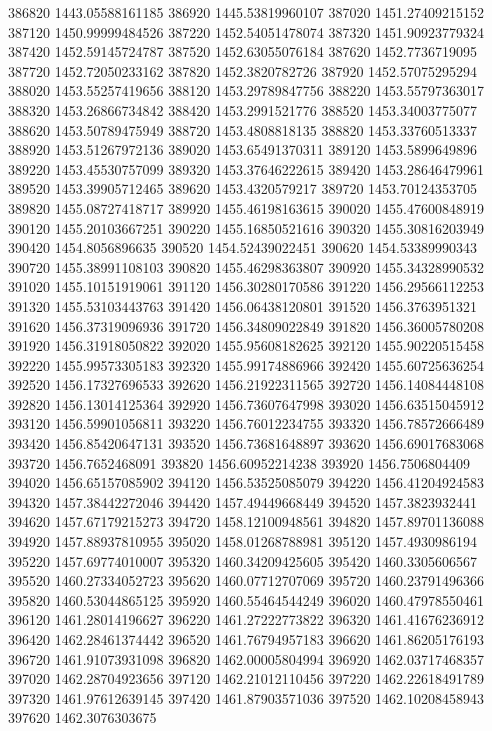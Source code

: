 {386820 1443.05588161185
386920 1445.53819960107
387020 1451.27409215152
387120 1450.99999484526
387220 1452.54051478074
387320 1451.90923779324
387420 1452.59145724787
387520 1452.63055076184
387620 1452.7736719095
387720 1452.72050233162
387820 1452.3820782726
387920 1452.57075295294
388020 1453.55257419656
388120 1453.29789847756
388220 1453.55797363017
388320 1453.26866734842
388420 1453.2991521776
388520 1453.34003775077
388620 1453.50789475949
388720 1453.4808818135
388820 1453.33760513337
388920 1453.51267972136
389020 1453.65491370311
389120 1453.5899649896
389220 1453.45530757099
389320 1453.37646222615
389420 1453.28646479961
389520 1453.39905712465
389620 1453.4320579217
389720 1453.70124353705
389820 1455.08727418717
389920 1455.46198163615
390020 1455.47600848919
390120 1455.20103667251
390220 1455.16850521616
390320 1455.30816203949
390420 1454.8056896635
390520 1454.52439022451
390620 1454.53389990343
390720 1455.38991108103
390820 1455.46298363807
390920 1455.34328990532
391020 1455.10151919061
391120 1456.30280170586
391220 1456.29566112253
391320 1455.53103443763
391420 1456.06438120801
391520 1456.3763951321
391620 1456.37319096936
391720 1456.34809022849
391820 1456.36005780208
391920 1456.31918050822
392020 1455.95608182625
392120 1455.90220515458
392220 1455.99573305183
392320 1455.99174886966
392420 1455.60725636254
392520 1456.17327696533
392620 1456.21922311565
392720 1456.14084448108
392820 1456.13014125364
392920 1456.73607647998
393020 1456.63515045912
393120 1456.59901056811
393220 1456.76012234755
393320 1456.78572666489
393420 1456.85420647131
393520 1456.73681648897
393620 1456.69017683068
393720 1456.7652468091
393820 1456.60952214238
393920 1456.7506804409
394020 1456.65157085902
394120 1456.53525085079
394220 1456.41204924583
394320 1457.38442272046
394420 1457.49449668449
394520 1457.3823932441
394620 1457.67179215273
394720 1458.12100948561
394820 1457.89701136088
394920 1457.88937810955
395020 1458.01268788981
395120 1457.4930986194
395220 1457.69774010007
395320 1460.34209425605
395420 1460.3305606567
395520 1460.27334052723
395620 1460.07712707069
395720 1460.23791496366
395820 1460.53044865125
395920 1460.55464544249
396020 1460.47978550461
396120 1461.28014196627
396220 1461.27222773822
396320 1461.41676236912
396420 1462.28461374442
396520 1461.76794957183
396620 1461.86205176193
396720 1461.91073931098
396820 1462.00005804994
396920 1462.03717468357
397020 1462.28704923656
397120 1462.21012110456
397220 1462.22618491789
397320 1461.97612639145
397420 1461.87903571036
397520 1462.10208458943
397620 1462.3076303675
}
